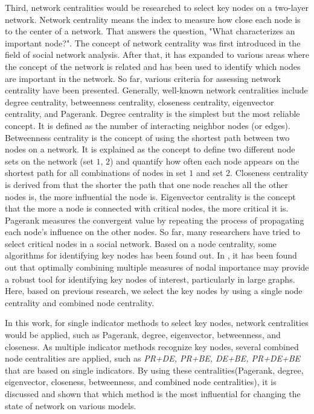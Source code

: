 Third, network centralities would be researched to select key nodes on a two-layer network. Network centrality means the index to measure how close each node is to the center of a network. That answers the question, "What characterizes an important node?". The concept of network centrality was first introduced in the field of social network analysis.\parencite{freeman1979} After that, it has expanded to various areas where the concept of the network is related and has been used to identify which nodes are important in the network. So far, various criteria for assessing network centrality have been presented. Generally, well-known network centralities include degree centrality, betweenness centrality, closeness centrality, eigenvector centrality, and Pagerank.\parencite{koschutzki2008, francisco2019, bianconi2018} Degree centrality is the simplest but the most reliable concept. It is defined as the number of interacting neighbor nodes (or edges). Betweenness centrality is the concept of using the shortest path between two nodes on a network. It is explained as the concept to define two different node sets on the network (set $1$, $2$) and quantify how often each node appears on the shortest path for all combinations of nodes in set $1$ and set $2$. Closeness centrality is derived from that the shorter the path that one node reaches all the other nodes is, the more influential the node is. Eigenvector centrality is the concept that the more a node is connected with critical nodes, the more critical it is. Pagerank measures the convergent value by repeating the process of propagating each node's influence on the other nodes.
So far, many researchers have tried to select critical nodes in a social network.\parencite{eom2015, white2003, mesgari2015, hwang1981, huang2014} Based on a node centrality, some algorithms for identifying key nodes has been found out. In \parencite{mesgari2015, huang2014}, it has been found out that optimally combining multiple measures of nodal importance may provide a robust tool for identifying key nodes of interest, particularly in large graphs. Here, based on previous research, we select the key nodes by using a single node centrality and combined node centrality.

In this work, for single indicator methods to select key nodes, network centralities would be applied, such as Pagerank, degree, eigenvector, betweenness, and closeness. As multiple indicator methods recognize key nodes, several combined node centralities are applied, such as \textit{PR+DE, PR+BE, DE+BE, PR+DE+BE} that are based on single indicators.  By using these centralities(Pagerank, degree, eigenvector, closeness, betweenness, and combined node centralities), it is discussed and shown that which method is the most influential for changing the state of network on various models.\\  

